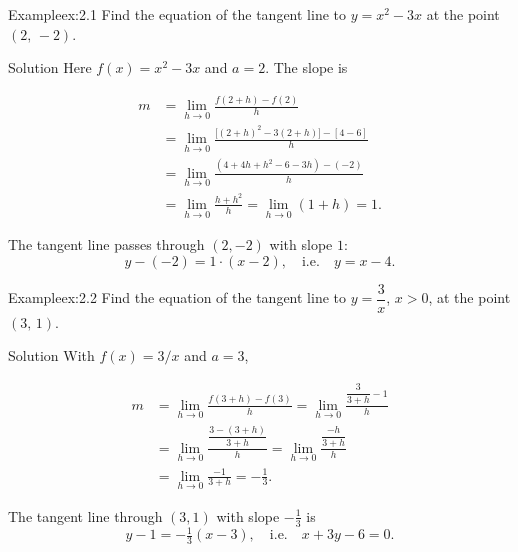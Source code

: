 \documentclass[a4paper,12pt,oneside]{memoir}
\begin{document}
\begin{workedexample}
\begin{envexample}{Example}{ex:2.1}{}
Find the equation of the tangent line to \(y = x^{2} - 3x\) at the point \((2,\, -2)\).
\end{envexample}
\begin{envsolution}{Solution}{}{}
Here \(f(x) = x^{2} - 3x\) and \(a = 2\). The slope is

\[ \begin{aligned}
          m &= \lim_{h \to 0} \frac{f(2 + h) - f(2)}{h} \\
            &= \lim_{h \to 0} \frac{\bigl[(2+h)^{2} - 3(2+h)\bigr] - [4 - 6]}{h} \\
            &= \lim_{h \to 0} \frac{(4 + 4h + h^{2} - 6 - 3h) - (-2)}{h} \\
            &= \lim_{h \to 0} \frac{h + h^{2}}{h}
             = \lim_{h \to 0} (1 + h) = 1.
        \end{aligned} \]

The tangent line passes through \((2, -2)\) with slope \(1\): \[ y - (-2) = 1 \cdot (x - 2), \quad \text{i.e.} \quad y = x - 4. \]
\end{envsolution}
\end{workedexample}
\begin{workedexample}
\begin{envexample}{Example}{ex:2.2}{}
Find the equation of the tangent line to \(y = \dfrac{3}{x}\), \(x > 0\), at the point \((3,\, 1)\).
\end{envexample}
\begin{envsolution}{Solution}{}{}
With \(f(x) = 3/x\) and \(a = 3\),

\[ \begin{aligned}
          m &= \lim_{h \to 0} \frac{f(3 + h) - f(3)}{h}
             = \lim_{h \to 0} \frac{\dfrac{3}{3 + h} - 1}{h} \\[6pt]
            &= \lim_{h \to 0} \frac{\dfrac{3 - (3 + h)}{3 + h}}{h}
             = \lim_{h \to 0} \frac{\dfrac{-h}{3 + h}}{h} \\[6pt]
            &= \lim_{h \to 0} \frac{-1}{3 + h} = -\frac{1}{3}.
        \end{aligned} \]

The tangent line through \((3, 1)\) with slope \(-\tfrac{1}{3}\) is \[ y - 1 = -\tfrac{1}{3}(x - 3), \quad \text{i.e.} \quad x + 3y - 6 = 0. \]
\end{envsolution}
\end{workedexample}
\end{document}
